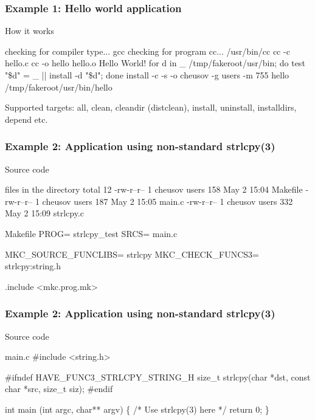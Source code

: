 \documentclass[hyperref={colorlinks=true}]{beamer}
\begin{document}
\begin{frame}[fragile]
  \frametitle{Example 1: Hello world application}

\begin{block}{How it works}
\begin{CodeNoLabel}
checking for compiler type... gcc
checking for program cc... /usr/bin/cc
cc     -c hello.c
cc   -o hello hello.o
Hello World!
for d in \_ /tmp/fakeroot/usr/bin; do  test "\$d" = \_ ||
   install -d "\$d";  done
install   -c -s  -o cheusov -g users -m 755
   hello /tmp/fakeroot/usr/bin/hello
\prompt{\$}
\end{CodeNoLabel}
\end{block}
Supported targets: all, clean, cleandir (distclean), install,
uninstall, installdirs, depend etc.
\end{frame}

\begin{frame}[fragile]
  \frametitle{Example 2: Application using non-standard strlcpy(3)}

\begin{block}{Source code}
  \begin{Code}{files in the directory}
total 12
-rw-r--r--  1 cheusov  users  158 May  2 15:04 Makefile
-rw-r--r--  1 cheusov  users  187 May  2 15:05 main.c
-rw-r--r--  1 cheusov  users  332 May  2 15:09 strlcpy.c
\prompt{\$}
  \end{Code}

  \begin{Code}{Makefile}
PROG=                 strlcpy_test
SRCS=                 main.c

MKC_SOURCE_FUNCLIBS=  strlcpy
MKC_CHECK_FUNCS3=     strlcpy:string.h

.include <mkc.prog.mk>
  \end{Code}
\end{block}

\end{frame}

\begin{frame}[fragile]
  \frametitle{Example 2: Application using non-standard strlcpy(3)}

\begin{block}{Source code}
\begin{Code}{main.c}
#include <string.h>

#ifndef HAVE_FUNC3_STRLCPY_STRING_H
size_t strlcpy(char *dst, const char *src, size_t siz);
#endif

int main (int argc, char** argv)
\{
    /*    Use strlcpy(3) here    */
    return 0;
\}
\end{Code}
\end{block}
\end{frame}
\end{document}
